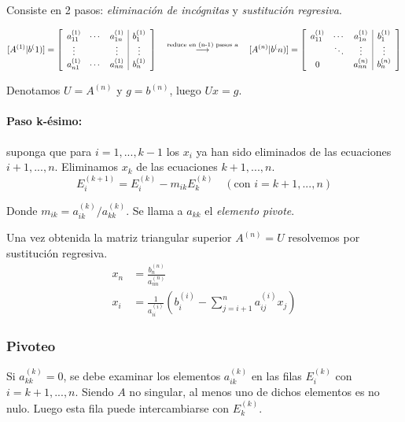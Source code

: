 Consiste en 2 pasos: \emph{eliminación de incógnitas} y
\emph{sustitución regresiva}.

\[
[A^{(1)} | b^(1)] = 
\left[ 
\begin{array}{c c c | c}
a_{11}^{(1)} & \cdots & a_{1n}^{(1)} & b_1^{(1)} \\ 
\vdots & & \vdots & \vdots \\
a_{n1}^{(1)} & \cdots & a_{nn}^{(1)} & b_n^{(1)}
\end{array} 
\right]
\quad
\stackrel{\text{reduce en (n-1) pasos a}}{\longrightarrow}
\quad
[A^{(n)} | b^(n)] = 
\left[ 
\begin{array}{c c c | c}
a_{11}^{(1)} & \cdots & a_{1n}^{(1)} & b_1^{(1)} \\ 
& \ddots & \vdots & \vdots \\
0 & & a_{nn}^{(n)} & b_n^{(n)}
\end{array} 
\right]
\]

Denotamos \(U = A^{(n)}\) y \(g = b^{(n)}\), luego \(Ux = g\).

\hypertarget{paso-k-uxe9simo}{%
\paragraph{Paso k-ésimo:}\label{paso-k-uxe9simo}}

suponga que para \(i = 1, ..., k-1\) los \(x_i\) ya han sido eliminados
de las ecuaciones \(i+1, ..., n\). Eliminamos \(x_k\) de las ecuaciones
\(k+1, ..., n\). \[
E_i^{(k+1)} = E_i^{(k)} - m_{ik} E_k^{(k)} \quad (\text{con } i = k+1, ..., n)
\]

Donde \(m_{ik} = a_{ik}^{(k)} / a_{kk}^{(k)}\). Se llama a \(a_{kk}\) el
\emph{elemento pivote}.

Una vez obtenida la matriz triangular superior \(A^{(n)} = U\)
resolvemos por sustitución regresiva. \begin{align*}
x_n &= \frac{b_n^{(n)}}{a_{nn}^{(n)}} \\
x_i &= \frac{1}{a_{ii}^{(i)}} 
  \left(  b_i^{(i)} - \sum_{j=i+1}^n a_{ij}^{(i)} x_j \right)
\end{align*}

\hypertarget{pivoteo}{%
\subsubsection{Pivoteo}\label{pivoteo}}

Si \(a_{kk}^{(k)} = 0\), se debe examinar los elementos \(a_{ik}^{(k)}\)
en las filas \(E_i^{(k)}\) con \(i = k+1, ..., n\). Siendo \(A\) no
singular, al menos uno de dichos elementos es no nulo. Luego esta fila
puede intercambiarse con \(E_k^{(k)}\).

